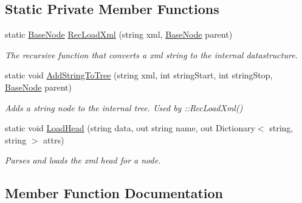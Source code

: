 \subsection*{Static Private Member Functions}
\begin{DoxyCompactItemize}
\item 
static \hyperlink{class_x_m_leru_handleru_1_1_base_node}{Base\+Node} \hyperlink{class_x_m_leru_handleru_1_1_x_m_l_file_manager_ab2319255e299a848a93e5b464615ecae}{Rec\+Load\+Xml} (string xml, \hyperlink{class_x_m_leru_handleru_1_1_base_node}{Base\+Node} parent)
\begin{DoxyCompactList}\small\item\em The recursive function that converts a xml string to the internal datastructure. \end{DoxyCompactList}\item 
static void \hyperlink{class_x_m_leru_handleru_1_1_x_m_l_file_manager_adb410d025ea3a465f050996541bb9d1c}{Add\+String\+To\+Tree} (string xml, int string\+Start, int string\+Stop, \hyperlink{class_x_m_leru_handleru_1_1_base_node}{Base\+Node} parent)
\begin{DoxyCompactList}\small\item\em Adds a string node to the internal tree. Used by \+::\+Rec\+Load\+Xml() \end{DoxyCompactList}\item 
static void \hyperlink{class_x_m_leru_handleru_1_1_x_m_l_file_manager_aecd66054ac6671e6723bd437fa5a73b1}{Load\+Head} (string data, out string name, out Dictionary$<$ string, string $>$ attrs)
\begin{DoxyCompactList}\small\item\em Parses and loads the xml head for a node. \end{DoxyCompactList}\end{DoxyCompactItemize}


\subsection{Member Function Documentation}
\hypertarget{class_x_m_leru_handleru_1_1_x_m_l_file_manager_adb410d025ea3a465f050996541bb9d1c}{}
